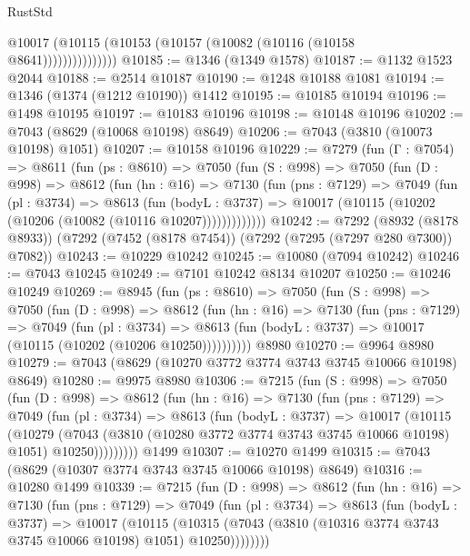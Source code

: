 \begin{lexlean}{RustStd}
\begin{coremodule}
                    @10017 (@10115 (@10153 (@10157 (@10082 (@10116 (@10158 @8641)))))))))))))))
@10185 := @1346 (@1349 @1578)
@10187 := @1132 @1523 @2044
@10188 := @2514 @10187
@10190 := @1248 @10188 @1081
@10194 := @1346 (@1374 (@1212 @10190)) @1412
@10195 := @10185 @10194
@10196 := @1498 @10195
@10197 := @10183 @10196
@10198 := @10148 @10196
@10202 := @7043 (@8629 (@10068 @10198) @8649)
@10206 := @7043 (@3810 (@10073 @10198) @1051)
@10207 := @10158 @10196
@10229 := @7279
    (fun (Γ : @7054) =>
    @8611
      (fun (ps : @8610) =>
      @7050
        (fun (S : @998) =>
        @7050
          (fun (D : @998) =>
          @8612
            (fun (hn : @16) =>
            @7130
              (fun (pns : @7129) =>
              @7049
                (fun (pl : @3734) =>
                @8613
                  (fun (bodyL : @3737) =>
                  @10017 (@10115 (@10202 (@10206 (@10082 (@10116 @10207)))))))))))))
@10242 := @7292
    (@8932 (@8178 @8933))
    (@7292 (@7452 (@8178 @7454)) (@7292 (@7295 (@7297 @280 @7300)) @7082))
@10243 := @10229 @10242
@10245 := @10080 (@7094 @10242)
@10246 := @7043 @10245
@10249 := @7101 @10242 @8134 @10207
@10250 := @10246 @10249
@10269 := @8945
    (fun (ps : @8610) =>
    @7050
      (fun (S : @998) =>
      @7050
        (fun (D : @998) =>
        @8612
          (fun (hn : @16) =>
          @7130
            (fun (pns : @7129) =>
            @7049
              (fun (pl : @3734) =>
              @8613 (fun (bodyL : @3737) => @10017 (@10115 (@10202 (@10206 @10250))))))))))
    @8980
@10270 := @9964 @8980
@10279 := @7043 (@8629 (@10270 @3772 @3774 @3743 @3745 @10066 @10198) @8649)
@10280 := @9975 @8980
@10306 := @7215
    (fun (S : @998) =>
    @7050
      (fun (D : @998) =>
      @8612
        (fun (hn : @16) =>
        @7130
          (fun (pns : @7129) =>
          @7049
            (fun (pl : @3734) =>
            @8613
              (fun (bodyL : @3737) =>
              @10017
                (@10115
                  (@10279
                    (@7043
                      (@3810 (@10280 @3772 @3774 @3743 @3745 @10066 @10198) @1051)
                      @10250)))))))))
    @1499
@10307 := @10270 @1499
@10315 := @7043 (@8629 (@10307 @3774 @3743 @3745 @10066 @10198) @8649)
@10316 := @10280 @1499
@10339 := @7215
    (fun (D : @998) =>
    @8612
      (fun (hn : @16) =>
      @7130
        (fun (pns : @7129) =>
        @7049
          (fun (pl : @3734) =>
          @8613
            (fun (bodyL : @3737) =>
            @10017
              (@10115
                (@10315 (@7043 (@3810 (@10316 @3774 @3743 @3745 @10066 @10198) @1051) @10250))))))))

\end{coremodule}
\end{lexlean}
